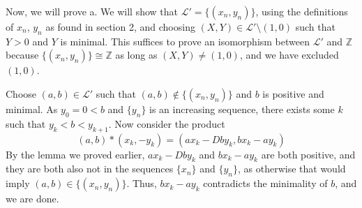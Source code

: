 \documentclass{article}
\begin{document}
Now, we will prove a. We will show that $\mathcal{L}' = \{(x_n,y_n)\}$, using the definitions of $x_n$, $y_n$ as found in section 2, and choosing $(X,Y) \in \mathcal{L}' \setminus (1,0)$ such that $Y > 0$ and $Y$ is minimal. This suffices to prove an isomorphism between $\mathcal{L}'$ and $\mathbb{Z}$ because $\{(x_n,y_n)\} \cong \mathbb{Z}$ as long as $(X,Y) \neq (1,0)$, and we have excluded $(1,0)$.

Choose $(a,b) \in \mathcal{L}'$ such that $(a,b) \notin \{(x_n,y_n)\}$ and $b$ is positive and minimal. As $y_0 = 0 < b$ and $\{y_n\}$ is an increasing sequence, there exists some $k$ such that $y_k < b < y_{k+1}$. Now consider the product $$(a,b)*(x_k,-y_k) = (ax_k - Dby_k, bx_k-ay_k)$$ By the lemma we proved earlier, $ax_k - Dby_k$ and $bx_k-ay_k$ are both positive, and they are both also not in the sequences $\{x_n\}$ and $\{y_n\}$, as otherwise that would imply $(a,b) \in \{(x_n,y_n)\}$. Thus, $bx_k - ay_k$ contradicts the minimality of $b$, and we are done.
\end{document}
